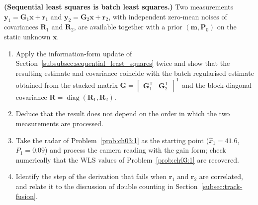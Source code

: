 \documentclass[graybox,envcountchap]{style/SNmono}
\DeclareMathOperator{\diag}{diag}
\begin{document}
\begin{prob}\label{prob:ch03:3}
\textbf{(Sequential least squares is batch least squares.)} Two measurements $\mathbf{y}_1=\mathbf{G}_1\mathbf{x}+\mathbf{r}_1$ and $\mathbf{y}_2=\mathbf{G}_2\mathbf{x}+\mathbf{r}_2$, with independent zero-mean noises of covariances $\mathbf{R}_1$ and $\mathbf{R}_2$, are available together with a prior $(\mathbf{m},\mathbf{P}_0)$ on the static unknown $\mathbf{x}$.
\begin{enumerate}
\item[(a)] Apply the information-form update of Section~\ref{subsubsec:sequential_least_squares} twice and show that the resulting estimate and covariance coincide with the batch regularised estimate obtained from the stacked matrix $\mathbf{G}=\begin{bmatrix}\mathbf{G}_1^{\mathsf T}&\mathbf{G}_2^{\mathsf T}\end{bmatrix}^{\mathsf T}$ and the block-diagonal covariance $\mathbf{R}=\diag(\mathbf{R}_1,\mathbf{R}_2)$.
\item[(b)] Deduce that the result does not depend on the order in which the two measurements are processed.
\item[(c)] Take the radar of Problem~\ref{prob:ch03:1} as the starting point ($\widehat{x}_1=41.6$, $P_1=0.09$) and process the camera reading with the gain form; check numerically that the WLS values of Problem~\ref{prob:ch03:1} are recovered.
\item[(d)] Identify the step of the derivation that fails when $\mathbf{r}_1$ and $\mathbf{r}_2$ are correlated, and relate it to the discussion of double counting in Section~\ref{subsec:track-fusion}.
\end{enumerate}
\end{prob}
\end{document}
